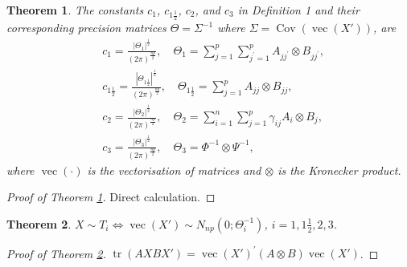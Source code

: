 \documentclass{amsart}
\newtheorem{theorem}{Theorem}[section]
\theoremstyle{definition}
\numberwithin{equation}{section}
\begin{document}
\begin{theorem} The constants $c_1$, $c_{1\frac{1}{2}}$, $c_2$, and $c_3$ in Definition 1 and their corresponding precision matrices $\varTheta = \varSigma^{-1}$ where $\varSigma = \operatorname{Cov}(\operatorname{vec}(X'))$, are 
\begin{align}
        & c_1 = \frac{| \varTheta_{1}|^{\frac{1}{2}}}{(2\pi)^{\frac{np}{2}}}, \quad  \varTheta_1 = \sum_{j=1}^{p}\sum_{j^{\prime}=1}^{p}  A_{jj^{\prime}} \otimes  B_{jj^{\prime}}, \\
    & c_{1\frac{1}{2}} = \frac{| \varTheta_{1\frac{1}{2}}|^{\frac{1}{2}}}{(2\pi)^{\frac{np}{2}}} , \quad  \varTheta_{1\frac{1}{2}} = \sum_{j=1}^{p}  A_{jj} \otimes  B_{jj}, \\
    & c_{2} = \frac{| \varTheta_{2}|^{\frac{1}{2}}}{(2\pi)^{\frac{np}{2}}}, \quad   \varTheta_{2} = \sum_{i=1}^{n}\sum_{j=1}^{p} \gamma_{ij}  A_{i} \otimes  B_{j},\\
        & c_{3} = \frac{| \varTheta_{3}|^{\frac{1}{2}}}{(2\pi)^{\frac{np}{2}}} ,\quad   \varTheta_{3} =   \varPhi^{-1} \otimes  \varPsi^{-1},
    \label{prop 1}
\end{align}
where $\operatorname{vec}(\cdot)$ is the vectorisation of matrices and $\otimes$ is the Kronecker product. %
\label{prop: nested precision form}
\end{theorem}
\begin{proof}[Proof of Theorem \ref{prop: nested precision form}] Direct calculation.
\end{proof}
    
\begin{theorem}\label{prop: nested precision form 2}
     $X\sim T_{i} \Leftrightarrow \operatorname{vec}( X ') \sim N_{np}( 0;  \varTheta^{-1}_i)$, $i = 1, 1\frac{1}{2}, 2, 3$.
\end{theorem}

\begin{proof}[Proof of Theorem \ref{prop: nested precision form 2}]
    $\operatorname{tr} ( A X B{ X}') = {\operatorname{vec}( X')}^{\prime}( A \otimes  B) \operatorname{vec}( X' )$.
\end{proof}
\end{document}
